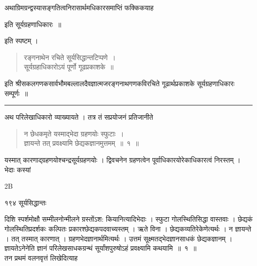 \documentclass[11pt, openany]{book}
\begin{document}
\begin{sloppypar}
अथाग्रिमग्रन्द्वस्यासङ्गतित्वनिरासार्थमधिकारसमाप्तिं फक्किकयाह\textendash
\end{sloppypar}
\vspace{2mm}

\begin{center}
  इति सूर्यग्रहणाधिकारः~॥
\end{center}

\noindent इति स्पष्टम् ।



\begin{quote}
  {\qt रङ्गनाथेन रचिते सूर्यसिद्धान्तटिप्पणे~।\\
 सूर्यग्रहाधिकारोऽयं पूर्णो गूढप्रकाशके~॥}
\end{quote}
\begin{sloppypar}
 इति श्रीसकलगणकसार्वभौमबल्लालदैवज्ञात्मजरङ्गनाथगणकविरचिते गूढार्थप्रकाशके सूर्यग्रहणाधिकारः सम्पूर्णः~॥
\end{sloppypar}
  
\begin{center}
 \rule{8em}{.5pt} 
\end{center}


 अथ परिलेखाधिकारो व्याख्यायते । तत्र तं सप्रयोजनं प्रतिजानीते\textendash



\begin{quote}
  {\ssi न छेधकमृते यस्माद्भेदा ग्रहणयोः स्फुटाः~।\\
 ज्ञायन्ते तत् प्रवक्ष्यामि छेद्यकज्ञानमुत्तमम्~॥~१~॥}
 \end{quote}


 यस्मात् कारणाद्ग्रहणयोश्चन्द्रसूर्यग्रहणयोः । द्विवचनेन ग्रहणत्वेन पूर्वाधिकारयोरेकाधिकारत्वं निरस्तम् । भेदाः कस्यां

 {\tiny{2B}}

\newpage



 \noindent १९४ \hspace{4cm} सूर्यसिद्धान्तः 
\vspace{1cm}

\begin{sloppypar}
\noindent दिशि स्पर्शमोक्षौ सम्मीलनोन्मीलने ग्रस्तोंऽश: कियानित्यादिभेदाः । स्फुटा गोलस्थितिसिद्धा वास्तवाः । छेद्यकं गोलस्थितिप्रदर्शकः कल्पितः प्रकारश्छेद्यकपदवाच्यस्तम् । ऋते विना । छेद्यकव्यतिरेकेणेत्यर्थः । न ज्ञायन्ते । तत् तस्मात् कारणात् । ग्रहणभेदज्ञानार्थमित्यर्थः । उत्तमं सूक्ष्मतद्भेदज्ञानसाधकं छेद्यकज्ञानम् । ज्ञायतेऽनेनेति ज्ञानं परिलेखसाधकग्रन्थं सूर्यांशपुरुषोऽहं प्रवक्ष्यामि कथयामि~॥~१~॥\\
\noindent तन प्रथमं वलनवृत्तं लिखेदित्याह\textendash
\end{sloppypar}
\end{document}
